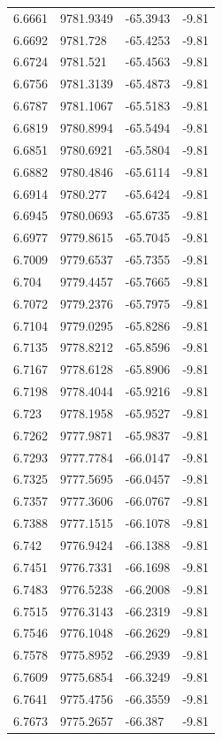 \begin{table}[H]
\begin{tabular}{llll}
6.6661 & 9781.9349 & -65.3943 & -9.81 \\
6.6692 & 9781.728 & -65.4253 & -9.81 \\
6.6724 & 9781.521 & -65.4563 & -9.81 \\
6.6756 & 9781.3139 & -65.4873 & -9.81 \\
6.6787 & 9781.1067 & -65.5183 & -9.81 \\
6.6819 & 9780.8994 & -65.5494 & -9.81 \\
6.6851 & 9780.6921 & -65.5804 & -9.81 \\
6.6882 & 9780.4846 & -65.6114 & -9.81 \\
6.6914 & 9780.277 & -65.6424 & -9.81 \\
6.6945 & 9780.0693 & -65.6735 & -9.81 \\
6.6977 & 9779.8615 & -65.7045 & -9.81 \\
6.7009 & 9779.6537 & -65.7355 & -9.81 \\
6.704 & 9779.4457 & -65.7665 & -9.81 \\
6.7072 & 9779.2376 & -65.7975 & -9.81 \\
6.7104 & 9779.0295 & -65.8286 & -9.81 \\
6.7135 & 9778.8212 & -65.8596 & -9.81 \\
6.7167 & 9778.6128 & -65.8906 & -9.81 \\
6.7198 & 9778.4044 & -65.9216 & -9.81 \\
6.723 & 9778.1958 & -65.9527 & -9.81 \\
6.7262 & 9777.9871 & -65.9837 & -9.81 \\
6.7293 & 9777.7784 & -66.0147 & -9.81 \\
6.7325 & 9777.5695 & -66.0457 & -9.81 \\
6.7357 & 9777.3606 & -66.0767 & -9.81 \\
6.7388 & 9777.1515 & -66.1078 & -9.81 \\
6.742 & 9776.9424 & -66.1388 & -9.81 \\
6.7451 & 9776.7331 & -66.1698 & -9.81 \\
6.7483 & 9776.5238 & -66.2008 & -9.81 \\
6.7515 & 9776.3143 & -66.2319 & -9.81 \\
6.7546 & 9776.1048 & -66.2629 & -9.81 \\
6.7578 & 9775.8952 & -66.2939 & -9.81 \\
6.7609 & 9775.6854 & -66.3249 & -9.81 \\
6.7641 & 9775.4756 & -66.3559 & -9.81 \\
6.7673 & 9775.2657 & -66.387 & -9.81 \\

\end{tabular}
\end{table}
